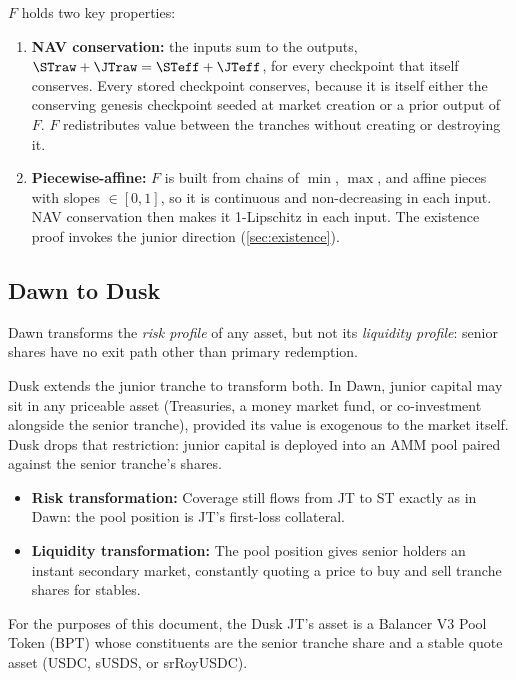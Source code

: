 $F$ holds two key properties:

\begin{enumerate}
  \item \textbf{NAV conservation:} the inputs sum to the outputs,
    $\STraw + \JTraw = \STeff + \JTeff$, for every checkpoint that
    itself conserves. Every stored checkpoint conserves, because it is
    itself either the conserving genesis checkpoint seeded at market
    creation or a prior output of $F$. $F$ redistributes value between the tranches without
    creating or destroying it.
  \item \textbf{Piecewise-affine:} $F$ is built from chains of $\min$,
    $\max$, and affine pieces with slopes $\in [0, 1]$, so it is
    continuous and non-decreasing in each input. NAV conservation then
    makes it 1-Lipschitz in each input. The existence proof invokes the
    junior direction (\cref{sec:existence}).
\end{enumerate}

\subsection{Dawn to Dusk}
\label{sec:overview:dawn-to-dusk}

Dawn transforms the \emph{risk profile} of any asset, but not its
\emph{liquidity profile}: senior shares have no exit path other than
primary redemption.

Dusk extends the junior tranche to transform both. In Dawn, junior
capital may sit in any priceable asset (Treasuries, a money market
fund, or co-investment alongside the senior tranche), provided its
value is exogenous to the market itself. Dusk drops that restriction:
junior capital is deployed into an AMM pool paired against the senior
tranche's shares.

\begin{itemize}
  \item \textbf{Risk transformation:} Coverage still flows from JT to ST exactly
    as in Dawn: the pool position is JT's first-loss collateral.
  \item \textbf{Liquidity transformation:} The pool position gives senior
    holders an instant secondary market, constantly quoting a price to
    buy and sell tranche shares for stables.
\end{itemize}

For the purposes of this document, the Dusk JT's asset is a Balancer V3
Pool Token (BPT) whose constituents are the senior tranche share and a
stable quote asset (USDC, sUSDS, or srRoyUSDC).

